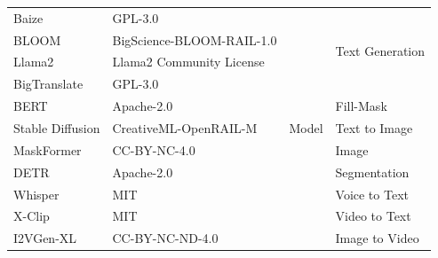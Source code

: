 \begin{table}[h]
\begin{tabular}{|p{1.6cm}|p{3cm}|p{0.6cm}|p{1.7cm}|}
      Baize & \textcolor{Copyleft}{GPL-3.0} & \multirow{11}{*}{Model} & \multirow{4}{*}{Text Generation}   \\ \cline{1-2}
      BLOOM & \textcolor{Permissive}{BigScience-BLOOM-RAIL-1.0} & &   \\ \cline{1-2}
      Llama2 & \textcolor{Permissive}{Llama2 Community License} & &   \\ \cline{1-2}
      BigTranslate & \textcolor{Copyleft}{GPL-3.0} & &   \\ \cline{1-2} \cline{4-4}

      BERT & \textcolor{Permissive}{Apache-2.0} &  & Fill-Mask   \\ \cline{1-2} \cline{4-4}

      Stable Diffusion & \textcolor{Permissive}{CreativeML-OpenRAIL-M} & & Text to Image  \\ \cline{1-2} \cline{4-4}

      MaskFormer & \textcolor{Permissive}{CC-BY-NC-4.0} & & Image  \\ \cline{1-2}
      DETR & \textcolor{Permissive}{Apache-2.0} & & Segmentation \\ \cline{1-2} \cline{4-4}

      Whisper & \textcolor{Permissive}{MIT} & & Voice to Text  \\ \cline{1-2} \cline{4-4}

      X-Clip & \textcolor{Permissive}{MIT} & & Video to Text  \\ \cline{1-2} \cline{4-4}

      I2VGen-XL & CC-BY-NC-ND-4.0 & & Image to Video  \\ \hline

      \end{tabular}
\end{table}


